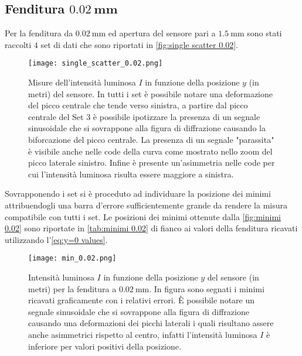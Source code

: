\documentclass[../main.tex]{subfiles}
\begin{document}
\subsection{Fenditura $\mathbf{\qty{0.02}{\mm}}$}

Per la fenditura da $\qty{0.02}{\mm}$ ed apertura del sensore pari a $\qty{1.5}{\mm}$ sono stati raccolti $4$ set di dati che sono riportati in \autoref{fig:single scatter 0.02}.

\begin{figure}[ht!]
    \centering
    \texttt{[image: single\_scatter\_0.02.png]}
    \caption{Misure dell'intensità luminosa $I$ in funzione della posizione $y$ (in metri) del sensore. In tutti i set è possibile notare una deformazione del picco centrale che tende verso sinistra, a partire dal picco centrale del Set $3$ è possibile ipotizzare la presenza di un segnale sinusoidale che si sovrappone alla figura di diffrazione causando la biforcazione del picco centrale. La presenza di un segnale "parassita" è visibile anche nelle code della curva come mostrato nello zoom del picco laterale sinistro. Infine è presente un'asimmetria nelle code per cui l'intensità luminosa risulta essere maggiore a sinistra.}
    \label{fig:single scatter 0.02}
\end{figure}

Sovrapponendo i set si è proceduto ad individuare la posizione dei minimi attribuendogli una barra d'errore sufficientemente grande da rendere la misura compatibile con tutti i set. Le posizioni dei minimi ottenute dalla \autoref{fig:minimi 0.02} sono riportate in \autoref{tab:minimi 0.02} di fianco ai valori della fenditura ricavati utilizzando l'\autoref{eq:y=0 values}.

\begin{figure}[ht!]
    \centering
    \texttt{[image: min\_0.02.png]}
    \caption{Intensità luminosa $I$ in funzione della posizione $y$ del sensore (in metri) per la fenditura a $\qty{0.02}{\milli\metre}$. In figura sono segnati i minimi ricavati graficamente con i relativi errori. È possibile notare un segnale sinusoidale che si sovrappone alla figura di diffrazione causando una deformazioni dei picchi laterali i quali risultano assere anche asimmetrici rispetto al centro, infatti l'intensità luminosa $I$ è inferiore per valori positivi della posizione.
    } %
    \label{fig:minimi 0.02}
\end{figure}
\end{document}
